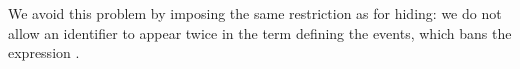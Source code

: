 We avoid this problem by imposing the same restriction as for hiding: we do
not allow an identifier to appear twice in the term defining the events, which
bans the expression .









